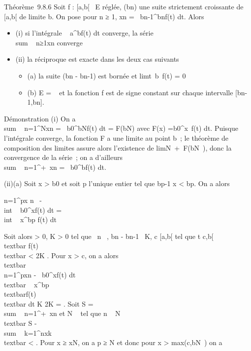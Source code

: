 Théorème~9.8.6 Soit f : {[}a,b{[}\rightarrow~ E réglée, (bn) une suite
strictement croissante de {[}a,b{[} de limite b. On pose pour n ≥ 1,
xn =\int ~
bn-1^bnf(t) dt. Alors

\begin{itemize}
\itemsep1pt\parskip0pt
\item
  (i) si l'intégrale \int ~
  a^bf(t) dt converge, la série
  \\sum ~
  n≥1xn converge
\item
  (ii) la réciproque est exacte dans les deux cas suivants

  \begin{itemize}
  \itemsep1pt\parskip0pt
  \item
    (a) la suite (bn - bn-1) est bornée et
    limt\rightarrow~b~f(t) = 0
  \item
    (b) E = ~ et la fonction f est de signe constant sur chaque
    intervalle {[}bn-1,bn{]}.
  \end{itemize}
\end{itemize}

Démonstration (i) On a
\\sum ~
n=1^Nxn =\int ~
b0^bNf(t) dt = F(bN) avec
F(x) =\int  b0^x~f(t)
dt. Puisque l'intégrale converge, la fonction F a une limite au point
b~; le théorème de composition des limites assure alors l'existence de
limN\rightarrow~+\infty~F(bN~), donc la
convergence de la série~; on a d'ailleurs
\\sum ~
n=1^+\infty~xn =\int ~
b0^bf(t) dt.

(ii)(a) Soit x \textgreater{} b0 et soit p l'unique entier tel
que bp-1 \leq x \textless{} bp. On a alors

\sum n=1^px n~
-\\int  ~
b0^xf(t) dt =
\\int  ~
x^bp f(t) dt

Soit alors \epsilon \textgreater{} 0, K \textgreater{} 0 tel que
\forall~n \in {}~, bn - bn-1~ \leq K, c \in
{[}a,b{[} tel que t \in {[}c,b{[}\rigtharrow~\\textbar{}
f(t)\\textbar{} \textless{} \epsilon \over 2K
. Pour x \textgreater{} c, on a alors
\\textbar{}\\\sum
 n=1^pxn -\int ~
b0^xf(t) dt\\textbar{}
\leq\int ~
x^bp\\textbar{}f(t)\\textbar{}
dt \leq K \epsilon \over 2K = \epsilon {} .
Soit S = \\sum ~
n=1^+\infty~xn et N \in {}~ tel que n \rigtharrow~ N
\rigtharrow~\\textbar{} S
-\\sum ~
k=1^nxk\\textbar{} \textless{}
\epsilon {} . Pour x ≥ xN, on a p ≥ N et donc
pour x \textgreater{} max(c,bN~) on a

